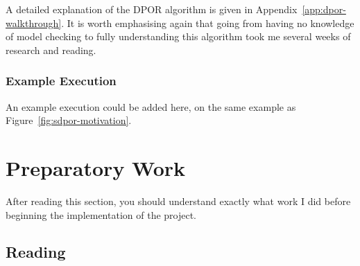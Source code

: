 \documentclass[12pt,a4paper,twoside,openright]{report}
\newcommand{\Let}[2]{\State \textbf{let} #1 = #2 \textbf{in}}
\begin{document}
A detailed explanation of the DPOR
algorithm is given in
Appendix~\ref{app:dpor-walkthrough}.
It is worth emphasising again that
going from having no knowledge of
model checking to
fully understanding this algorithm
took me several weeks
of research and reading.

\newcommand{\dporpseudocode}{
	\begin{algorithmic}[1]
		\Procedure{Explore}{$\pi$}
		\Let{$\sigma$}{$\textit{last}(\pi)$}
		\ForAll{$p \in \mathcal{P}$}
		\State \Call{UpdateBacktrackSets}
		{$\pi,\, \textit{next}(\sigma, p)$}
		\EndFor
		\If{$\textit{enabled}(\sigma) \neq \emptyset$}
		\Let{$t$}{any $t \in \textit{enabled}(\sigma)$}
		\Let{$\textit{backtrack}(\sigma)$}{$\{t\}$}
		\Let{$\textit{done}(\sigma)$}{$\emptyset$}
		\While{$\textit{done}(\sigma)
			 \neq \textit{backtrack}(\sigma)$}
		\Let{$t$}{any $t \in (\textit{backtrack}(\sigma)
			\setminus \textit{done}(\sigma))$}
		\State add $t$ to $\textit{done}(\sigma);$
		\State \Call{Explore}{$\pi.t$}

		\EndWhile
		\EndIf
		\EndProcedure
		\State
		\Procedure{UpdateBacktrackSets}{$\pi,\, t_{p,s}$}
		\Let{$D$}{$\{i \in \textit{dom}(\pi) \mid
			\pi_i \text{ is dependent with } t_{p,s}
			\text{ and } (i, p)\!\not \hookrightarrow_\pi \}$}
		\If{$D \neq \emptyset$}
		\Let{$\sigma_d$}
		{$\textit{pre}(\pi,\text{max}(D))$}
		\If{$\textit{next}(\sigma_d, p)
			\in \textit{enabled}(\sigma_d)$}
		add $\textit{next}(\sigma_d, p)$
		to $\textit{backtrack}(\sigma_d)$
		\Else {
			add all of $\textit{enabled}(\sigma_d)$
			to $\textit{backtrack}(\sigma_d)$
		} \EndIf
		\EndIf
		\EndProcedure
		\State
		\State Initially: \Call{Explore}{$\emptyset$}
	\end{algorithmic}
}

\subsubsection{Example Execution}
An example execution could be added here, on the same example as
Figure~\ref{fig:sdpor-motivation}.

\section{Preparatory Work}
After reading this section, you
should understand exactly what work I
did before beginning the implementation
of the project.

\subsection{Reading}
\end{document}
